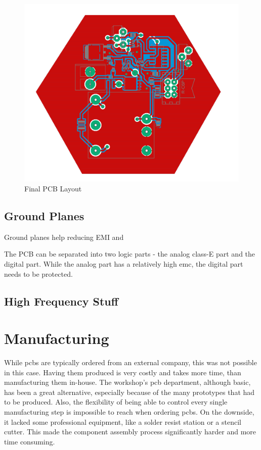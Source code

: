 \begin{figure}[h!]
    \centering
    \includegraphics[width=\textwidth]{kassandra/resources/Tesla6Final.PNG}
    \caption{Final PCB Layout}
    \label{fig:tesla_layout}
\end{figure}

\subsection{Ground Planes}

Ground planes help reducing EMI and

The PCB can be separated into two logic parts - the analog class-E part and the digital part. While the analog part has a relatively high \gls{emc}, the digital part needs to be protected. 

\subsection{High Frequency Stuff}

\section{Manufacturing}

While \glspl{pcb} are typically ordered from an external company, this was not possible in this case. Having them produced is very costly and takes more time, than manufacturing them in-house. The workshop's \gls{pcb} department, although basic, has been a great alternative, especially because of the many prototypes that had to be produced. Also, the flexibility of being able to control every single manufacturing step is impossible to reach when ordering \glspl{pcb}. On the downside, it lacked some professional equipment, like a solder resist station or a stencil cutter. This made the component assembly process significantly harder and more time consuming.

